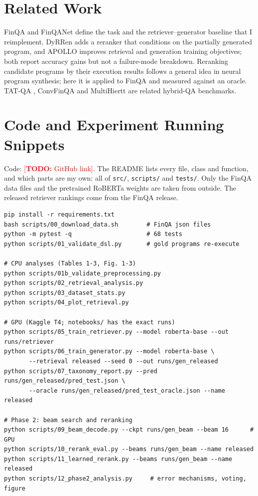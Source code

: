 \documentclass{article}
\newcommand{\todo}[1]{\textcolor{red}{[\textbf{TODO:} #1]}}
\newcommand{\code}[1]{\texttt{#1}}
\begin{document}
\section{Related Work}

FinQA and FinQANet \citep{chen2021finqa} define the task and the retriever--generator baseline that I reimplement. DyRRen \citep{li2023dyrren} adds a reranker that conditions on the partially generated program, and APOLLO \citep{sun2022apollo} improves retrieval and generation training objectives; both report accuracy gains but not a failure-mode breakdown. Reranking candidate programs by their execution results follows a general idea in neural program synthesis; here it is applied to FinQA and measured against an oracle. TAT-QA \citep{zhu2021tatqa}, ConvFinQA \citep{chen2022convfinqa} and MultiHiertt \citep{zhao2022multihiertt} are related hybrid-QA benchmarks.

\section{Code and Experiment Running Snippets}
Code: \todo{GitHub link}. The README lists every file, class and function, and which parts are my own: all of \code{src/}, \code{scripts/} and \code{tests/}. Only the FinQA data files and the pretrained RoBERTa weights are taken from outside. The released retriever rankings come from the FinQA release.
{\small
\begin{verbatim}
pip install -r requirements.txt
bash scripts/00_download_data.sh        # FinQA json files
python -m pytest -q                     # 68 tests
python scripts/01_validate_dsl.py       # gold programs re-execute

# CPU analyses (Tables 1-3, Fig. 1-3)
python scripts/01b_validate_preprocessing.py
python scripts/02_retrieval_analysis.py
python scripts/03_dataset_stats.py
python scripts/04_plot_retrieval.py

# GPU (Kaggle T4; notebooks/ has the exact runs)
python scripts/05_train_retriever.py --model roberta-base --out runs/retriever
python scripts/06_train_generator.py --model roberta-base \
       --retrieval released --seed 0 --out runs/gen_released
python scripts/07_taxonomy_report.py --pred runs/gen_released/pred_test.json \
       --oracle runs/gen_released/pred_test_oracle.json --name released

# Phase 2: beam search and reranking
python scripts/09_beam_decode.py --ckpt runs/gen_beam --beam 16      # GPU
python scripts/10_rerank_eval.py --beams runs/gen_beam --name released
python scripts/11_learned_rerank.py --beams runs/gen_beam --name released
python scripts/12_phase2_analysis.py     # error mechanisms, voting, figure
\end{verbatim}}



\end{document}
